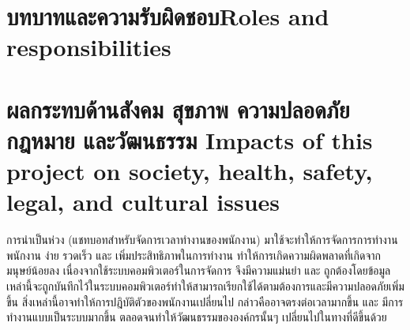 \section{\ifcpe บทบาทและความรับผิดชอบ\else Roles and responsibilities\fi}

\section{\ifcpe%
ผลกระทบด้านสังคม สุขภาพ ความปลอดภัย กฎหมาย และวัฒนธรรม
\else%
Impacts of this project on society, health, safety, legal, and cultural issues
\fi}
การนำเป็นห่วง (แชทบอทสำหรับจัดการเวลาทำงานของพนักงาน) 
มาใช้จะทำให้การจัดการการทำงานพนักงาน ง่าย รวดเร็ว และ เพิ่มประสิทธิภาพในการทำงาน 
ทำให้การเกิดความผิดพลาดที่เกิดจากมนุษย์น้อยลง เนื่องจากใช้ระบบคอมพิวเตอร์ในการจัดการ 
จึงมีความแม่นยำ และ ถูกต้องโดยข้อมูลเหล่านี้จะถูกบันทึกไว้ในระบบคอมพิวเตอร์ทำให้สามารถเรียกใช้ได้ตามต้องการและมีความปลอดภัยเพิ่มขึ้น 
สิ่งเหล่านี้อาจทำให้การปฎิบัติตัวของพนักงานเปลี่ยนไป กล่าวคืออาจตรงต่อเวลามากขึ้น และ 
มีการทำงานแบบเป็นระบบมากขึ้น ตลอดจนทำให้วัฒนธรรมขององค์กรนั้นๆ เปลี่ยนไปในทางที่ดีขึ้นด้วย